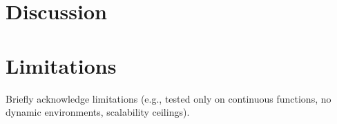 {	%


\section{Discussion}









\section{Limitations}

Briefly acknowledge limitations (e.g., tested only on continuous functions, no dynamic environments, scalability ceilings).





}
